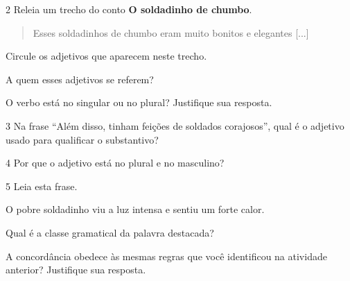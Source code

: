 \begin{escolha}
\begin{escolha}
{\begin{escolha}
\num{2} Releia um trecho do conto \textbf{O soldadinho de chumbo}.

\begin{quote}
Esses soldadinhos de chumbo eram muito bonitos e elegantes
{[}...{]}
\end{quote}

\begin{escolha}
\item
  Circule os adjetivos que aparecem neste trecho.


\item
  A quem esses adjetivos se referem?


\item O verbo está no singular ou no plural? Justifique sua resposta.

\end{escolha}

\num{3} Na frase ``Além disso, tinham feições de soldados corajosos'', qual é o
adjetivo usado para qualificar o substantivo?


\num{4} Por que o adjetivo está no plural e no masculino?



\num{5} Leia esta frase.

\begin{mdframed}[linewidth=10pt,linecolor=salmao!20,backgroundcolor=salmao!20,roundcorner=20pt]
O pobre soldadinho viu a luz intensa e sentiu um forte calor.
\end{mdframed}

\begin{escolha}
\item Qual é a classe gramatical da palavra destacada?


\item A concordância obedece às mesmas regras que você identificou na
  atividade anterior? Justifique sua resposta.

\end{escolha}


\end{escolha}}
\end{escolha}
\end{escolha}

